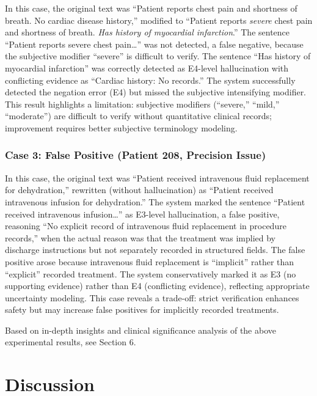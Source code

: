 \documentclass[11pt]{article}
\begin{document}
In this case, the original text was ``Patient reports chest pain and shortness of breath. No cardiac disease history,'' modified to ``Patient reports \emph{severe} chest pain and shortness of breath. \emph{Has history of myocardial infarction}.'' The sentence ``Patient reports severe chest pain\ldots{}'' was not detected, a false negative, because the subjective modifier ``severe'' is difficult to verify. The sentence ``Has history of myocardial infarction'' was correctly detected as E4-level hallucination with conflicting evidence as ``Cardiac history: No records.'' The system successfully detected the negation error (E4) but missed the subjective intensifying modifier. This result highlights a limitation: subjective modifiers (``severe,'' ``mild,'' ``moderate'') are difficult to verify without quantitative clinical records; improvement requires better subjective terminology modeling.

\subsubsection{Case 3: False Positive (Patient 208, Precision Issue)}

In this case, the original text was ``Patient received intravenous fluid replacement for dehydration,'' rewritten (without hallucination) as ``Patient received intravenous infusion for dehydration.'' The system marked the sentence ``Patient received intravenous infusion\ldots{}'' as E3-level hallucination, a false positive, reasoning ``No explicit record of intravenous fluid replacement in procedure records,'' when the actual reason was that the treatment was implied by discharge instructions but not separately recorded in structured fields. The false positive arose because intravenous fluid replacement is ``implicit'' rather than ``explicit'' recorded treatment. The system conservatively marked it as E3 (no supporting evidence) rather than E4 (conflicting evidence), reflecting appropriate uncertainty modeling. This case reveals a trade-off: strict verification enhances safety but may increase false positives for implicitly recorded treatments.

Based on in-depth insights and clinical significance analysis of the above experimental results, see Section 6.

\section{Discussion}
\end{document}

